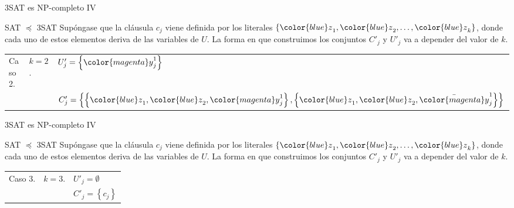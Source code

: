 \documentclass[10pt, mathserif, profesionalfont]{beamer}
\begin{document}
\begin{frame}{3SAT es NP-completo IV}

\begin{block}{SAT $\preceq$ 3SAT}
Supóngase que la cláusula $c_j$ viene definida por los literales $\left \{ {\color{blue}z}_1, {\color{blue}z}_2, \dots, {\color{blue}z}_k  \right\}$, donde cada uno de estos elementos deriva de las variables de $U$. La forma en que construimos los conjuntos  $C'_j$ y $U'_j$ va a depender del valor de $k$.

\vspace{0.5cm}
{\small
\renewcommand{\arraystretch}{1.8}
\begin{tabular}{@{}L{.10\textwidth}L{.10\textwidth}L{.70\textwidth}@{}}
Caso 2. & $k = 2$. & $U'_j = \left \{ {\color{magenta}y}_j^1 \right \}$ \\
        &          &$C'_j = \left \{ \left \{  {\color{blue}z}_1, {\color{blue}z}_2, {\color{magenta}y}_j^1  \right \}, \left \{  {\color{blue}z}_1, {\color{blue}z}_2, \bar{{\color{magenta}y}}_j^1  \right \}   \right \}$  \\
\end{tabular}
}
\end{block}

\end{frame}


\begin{frame}{3SAT es NP-completo IV}

\begin{block}{SAT $\preceq$ 3SAT}
Supóngase que la cláusula $c_j$ viene definida por los literales $\left \{ {\color{blue}z}_1, {\color{blue}z}_2, \dots, {\color{blue}z}_k  \right\}$, donde cada uno de estos elementos deriva de las variables de $U$. La forma en que construimos los conjuntos  $C'_j$ y $U'_j$ va a depender del valor de $k$.

\vspace{0.5cm}
{\small
\renewcommand{\arraystretch}{1.8}
\begin{tabular}{@{}L{.10\textwidth}L{.10\textwidth}L{.70\textwidth}@{}}
Caso 3. & $k = 3$. & $U'_j = \emptyset$ \\
        &          &$C'_j = \left \{  c_j  \right \}$   \\
\end{tabular}
}
\end{block}

\end{frame}
\end{document}
